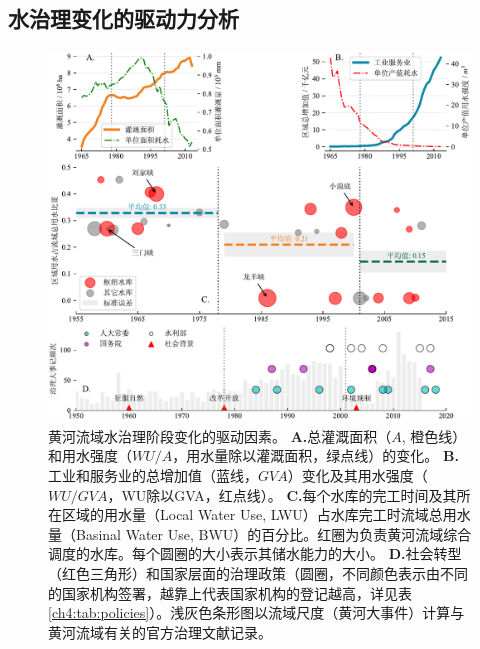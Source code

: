 




\subsection{水治理变化的驱动力分析}\label{ch4:sec:mechanism}

\begin{figure}[th!]
	\centering
	\includegraphics[width=\textwidth]{img/ch4/causes.pdf}
	\caption[黄河流域水治理阶段变化的驱动因素]{
		黄河流域水治理阶段变化的驱动因素。
		\textbf{A.}总灌溉面积（$A$, 橙色线）和用水强度（$WU/A$，用水量除以灌溉面积，绿点线）的变化。
        \textbf{B.}工业和服务业的总增加值（蓝线，$GVA$）变化及其用水强度（$WU/GVA$，WU除以GVA，红点线）。
        \textbf{C.}每个水库的完工时间及其所在区域的用水量（Local Water Use, LWU）占水库完工时流域总用水量（Basinal Water Use, BWU）的百分比。红圈为负责黄河流域综合调度的水库。每个圆圈的大小表示其储水能力的大小。
        \textbf{D.}社会转型（红色三角形）和国家层面的治理政策（圆圈，不同颜色表示由不同的国家机构签署，越靠上代表国家机构的登记越高，详见表\ref{ch4:tab:policies}）。浅灰色条形图以流域尺度（黄河大事件）计算与黄河流域有关的官方治理文献记录。}\label{ch4:fig:mechanism}
\end{figure}


